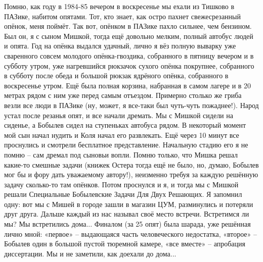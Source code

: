 Помню, как году в 1984-85 вечером в воскресенье мы ехали из Тишково в ПАЗике, набитом опятами. Тот, кто знает, как остро пахнет свежесрезанный опёнок, меня поймёт. Так вот, опёнком в ПАЗике пахло сильнее, чем бензином. Был он, я с сыном Мишкой, тогда ещё довольно мелким, полный автобус людей и опята. Год на опёнка выдался удачный, лично я вёз полную выварку уже сваренного совсем молодого опёнка-гвоздика, собранного в пятницу вечером и в субботу утром, уже нагревшийся рюкзачок сухого опёнка покрупнее, собранного в субботу после обеда и большой рюкзак ядрёного опёнка, собранного в воскресенье утром. Ещё была полная корзина, набранная в самом лагере и в 20 метрах рядом с ним уже перед самым отъездом. Примерно столько же гриба везли все люди в ПАЗике (ну, может, я все-таки был чуть-чуть пожаднее!). Народ устал после резанья опят, и все начали дремать. Мы с Мишкой сидели на сиденье, а Бобылев сидел на ступеньках автобуса рядом. В некоторый момент мой сын начал нудить и Коля начал его развлекать. Ещё через 10 минут все проснулись и смотрели бесплатное представление. Начальную стадию его я не помню – сам дремал под сыновьи вопли. Помню только, что Мишка решал какие-то смешные задачи (книжек Остера тогда ещё не было, но, думаю, Бобылев мог бы и фору дать уважаемому автору!), неизменно требуя за каждую решённую задачу сколько-то там опёнков. Потом  проснулся и я, и тогда мы с Мишкой решали Специальные Бобылевские Задачи Для Двух Решающих. Я запомнил одну: вот мы с Мишей в городе зашли в магазин ЦУМ, разминулись и потеряли друг друга. Дальше каждый из нас называл своё место встречи. Встретимся ли мы? Мы встретились дома... Финалом (за 25 опят) была шарада, уже решённая лично мной: «первое» – выдающаяся часть человеческого недостатка, «второе» – Бобылев один в большой пустой тюремной камере, «все вместе» – апробация диссертации. Мы и не заметили, как доехали до дома...

